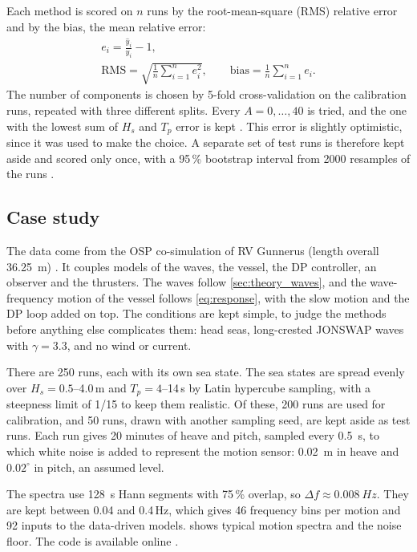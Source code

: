 \documentclass[10pt,a4paper,twocolumn,twoside]{article}
\newcommand{\Hs}{H_{s}}
\newcommand{\Tp}{T_{p}}
\begin{document}
Each method is scored on $n$ runs by the root-mean-square (RMS) relative error and by the bias,
the mean relative error:
\begin{equation}
\begin{gathered}
e_i = \frac{\hat y_i}{y_i} - 1, \\
\mathrm{RMS} = \sqrt{\frac{1}{n}\sum_{i=1}^{n} e_i^2}, \qquad
\mathrm{bias} = \frac{1}{n}\sum_{i=1}^{n} e_i.
\end{gathered}
\label{eq:scores}
\end{equation}
The number of components is chosen by 5-fold
cross-validation on the calibration runs, repeated with three different splits. Every
$A = 0,\dots,40$ is tried, and the one with the lowest sum of $\Hs$ and $\Tp$ error is kept
\citep{hastie2009}. This error is slightly
optimistic, since it was used to make the choice. A separate set of test runs is therefore kept
aside and scored only once, with a 95\,\% bootstrap interval from 2000 resamples of the runs
\citep{hastie2009}.

\subsection{Case study}
\label{sec:case}

The data come from the OSP co-simulation of RV Gunnerus (length overall \SI{36.25}{m})
\citep{ospdpsimpy}. It couples models of the waves, the vessel, the DP controller, an observer and
the thrusters. The waves follow \cref{sec:theory_waves}, and the wave-frequency motion of the vessel
follows \cref{eq:response}, with the slow motion and the DP loop added on top. The conditions are
kept simple, to judge the methods before anything else complicates them: head seas, long-crested
JONSWAP waves with $\gamma = 3.3$, and no wind or current.

There are 250 runs, each with its own sea state. The sea states are spread evenly over
$\Hs = 0.5$--4.0\,m and $\Tp = 4$--14\,s by Latin hypercube sampling, with a steepness limit of
1/15 to keep them realistic. Of these, 200 runs are used for calibration, and 50 runs, drawn with
another sampling seed, are kept aside as test runs. Each run gives 20 minutes of heave and pitch, sampled
every \SI{0.5}{s}, to which white noise is added to represent the motion sensor: \SI{0.02}{m} in
heave and $0.02^\circ$ in pitch, an assumed level.

The spectra use \SI{128}{s} Hann segments with 75\,\% overlap, so $\Delta f \approx \SI{0.008}{Hz}$.
They are kept between 0.04 and 0.4\,Hz, which gives 46 frequency bins per motion and 92 inputs to
the data-driven models.  shows typical motion spectra and the noise floor. The code is available online \citep{boland2026sse}.
\end{document}
